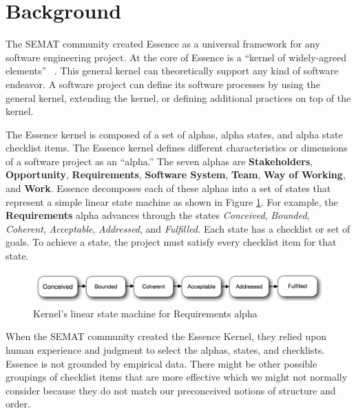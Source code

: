\documentclass[preprint,12pt,3p]{elsarticle}
\begin{document}

\section{Background}
The SEMAT community created Essence as a universal framework for any software engineering project. At the core of Essence is a ``kernel of widely-agreed elements'' ~\cite{JacobsonQueue}. This general kernel can theoretically support any kind of software endeavor. A software project can define its software processes by using the general kernel, extending the kernel, or defining additional practices on top of the kernel.

The Essence kernel is composed of a set of alphas, alpha states, and alpha state checklist items. The Essence kernel defines different characteristics or dimensions of a software project as an ``alpha.'' The seven alphas are \textbf{Stakeholders}, \textbf{Opportunity}, \textbf{Requirements}, \textbf{Software System}, \textbf{Team}, \textbf{Way of Working}, and \textbf{Work}. Essence decomposes each of these alphas into a set of states that represent a simple linear state machine as shown in Figure \ref{StateMachine}. For example, the \textbf{Requirements} alpha advances through the states \textit{Conceived}, \textit{Bounded}, \textit{Coherent}, \textit{Acceptable}, \textit{Addressed}, and \textit{Fulfilled.} Each state has a checklist or set of goals. To achieve a state, the project must satisfy every checklist item for that state. \cite{OMGStandard} 
 
\begin{figure}[h]
\includegraphics[width=5.4in]{kernel_images/StateMachineRequirements}
\caption{Kernel's linear state machine for Requirements alpha}\label{StateMachine}
\end{figure}

When the SEMAT community created the Essence Kernel, they relied upon human experience and judgment to select the alphas, states, and checklists. Essence is not grounded by empirical data. There might be other possible groupings of checklist items that are more effective which we might not normally consider because they do not match our preconceived notions of structure and order.
\end{document}

